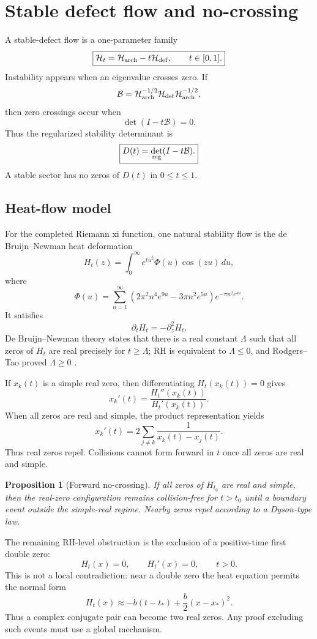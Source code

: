 \documentclass[11pt]{article}
\newtheorem{proposition}[theorem]{Proposition}
\newcommand{\Hess}{\mathcal H}
\begin{document}
\section{Stable defect flow and no-crossing}

A stable-defect flow is a one-parameter family
\[
\boxed{
        \Hess_t=\Hess_{\rm arch}-t\Hess_{\rm def},\qquad t\in[0,1].
}
\]
Instability appears when an eigenvalue crosses zero. If
\[
        \mathcal B=\Hess_{\rm arch}^{-1/2}\Hess_{\rm def}\Hess_{\rm arch}^{-1/2},
\]
then zero crossings occur when
\[
        \det(I-t\mathcal B)=0.
\]
Thus the regularized stability determinant is
\[
\boxed{
        D(t)=\det_{\rm reg}(I-t\mathcal B).
}
\]
A stable sector has no zeros of $D(t)$ in $0\le t\le1$.

\subsection{Heat-flow model}

For the completed Riemann xi function, one natural stability flow is the de Bruijn--Newman heat deformation
\[
\boxed{
        H_t(z)=\int_0^\infty e^{tu^2}\Phi(u)\cos(zu)\,du,
}
\]
where
\[
\boxed{
\Phi(u)=\sum_{n=1}^{\infty}\left(2\pi^2n^4e^{9u}-3\pi n^2e^{5u}\right)e^{-\pi n^2e^{4u}}.
}
\]
It satisfies
\[
        \partial_tH_t=-\partial_z^2H_t.
\]
De Bruijn--Newman theory states that there is a real constant $\Lambda$ such that all zeros of $H_t$ are real precisely for $t\ge\Lambda$; RH is equivalent to $\Lambda\le0$, and Rodgers--Tao proved $\Lambda\ge0$ \cite{RodgersTao2018}.

If $x_k(t)$ is a simple real zero, then differentiating $H_t(x_k(t))=0$ gives
\[
        x_k'(t)=\frac{H_t''(x_k(t))}{H_t'(x_k(t))}.
\]
When all zeros are real and simple, the product representation yields
\[
\boxed{
        x_k'(t)=2\sum_{j\ne k}\frac{1}{x_k(t)-x_j(t)}.
}
\]
Thus real zeros repel. Collisions cannot form forward in $t$ once all zeros are real and simple.

\begin{proposition}[Forward no-crossing]
If all zeros of $H_{t_0}$ are real and simple, then the real-zero configuration remains collision-free for $t>t_0$ until a boundary event outside the simple-real regime. Nearby zeros repel according to a Dyson-type law.
\end{proposition}

The remaining RH-level obstruction is the exclusion of a positive-time first double zero:
\[
\boxed{
        H_t(x)=0,
        \qquad
        H_t'(x)=0,
        \qquad
        t>0.
}
\]
This is not a local contradiction: near a double zero the heat equation permits the normal form
\[
        H_t(x)\approx -b(t-t_*)+\frac b2(x-x_*)^2.
\]
Thus a complex conjugate pair can become two real zeros. Any proof excluding such events must use a global mechanism.
\end{document}
